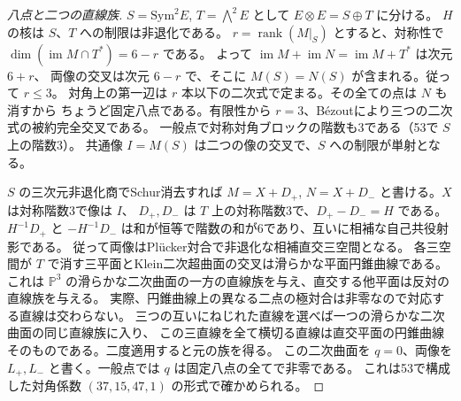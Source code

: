 \begin{proof}[八点と二つの直線族]
$S=\mathrm{Sym}^2E$, $T=\bigwedge^2 E$ として $E\otimes E=S\oplus T$ に分ける。
$H$ の核は $S$、$T$ への制限は非退化である。
$r=\operatorname{rank}(M|_S)$ とすると、対称性で
$\dim(\operatorname{im} M\cap T^*)=6-r$ である。
よって $\operatorname{im}M+\operatorname{im}N=\operatorname{im}M+T^*$ は次元 $6+r$、
両像の交叉は次元 $6-r$ で、そこに $M(S)=N(S)$ が含まれる。従って $r\le3$。
対角上の第一辺は $r$ 本以下の二次式で定まる。その全ての点は $N$ も消すから
ちょうど固定八点である。有限性から $r=3$、Bézoutにより三つの二次式の被約完全交叉である。
一般点で対称対角ブロックの階数も3である（53で $S$ 上の階数3）。
共通像 $I=M(S)$ は二つの像の交叉で、$S$ への制限が単射となる。

$S$ の三次元非退化商でSchur消去すれば
$M=X+D_+$, $N=X+D_-$ と書ける。$X$ は対称階数3で像は $I$、
$D_+,D_-$ は $T$ 上の対称階数3で、$D_+-D_-=H$ である。
$H^{-1}D_+$ と $-H^{-1}D_-$ は和が恒等で階数の和が6であり、互いに相補な自己共役射影である。
従って両像はPlücker対合で非退化な相補直交三空間となる。
各三空間が $T$ で消す三平面とKlein二次超曲面の交叉は滑らかな平面円錐曲線である。
これは $\mathbb P^3$ の滑らかな二次曲面の一方の直線族を与え、直交する他平面は反対の直線族を与える。
実際、円錐曲線上の異なる二点の極対合は非零なので対応する直線は交わらない。
三つの互いにねじれた直線を選べば一つの滑らかな二次曲面の同じ直線族に入り、
この三直線を全て横切る直線は直交平面の円錐曲線そのものである。二度適用すると元の族を得る。
この二次曲面を $q=0$、両像を $L_+,L_-$ と書く。一般点では $q$ は固定八点の全てで非零である。
これは53で構成した対角係数 $(37,15,47,1)$ の形式で確かめられる。
\end{proof}

